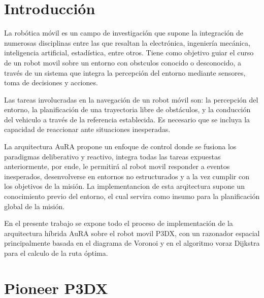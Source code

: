 \documentclass[11pt,twoside,A5]{article}
\begin{document}
%
%
%

\section*{Introducción}

La robótica móvil es un campo de investigación que supone la integración de numerosas disciplinas
entre las que resaltan la electrónica, ingeniería mecánica,
inteligencia artificial, estadística, entre otros. Tiene como objetivo 
guiar el curso de un robot movil sobre un entorno con obstculos conocido o desconocido,
a través de un sistema que integra la percepción del entorno mediante
sensores, toma de decisiones y acciones.

Las tareas involucradas en la navegación de un robot móvil son: la percepción del
entorno, la planificación de una trayectoria libre de obstáculos, y la conducción del vehiculo a través de la referencia establecida.
Es necesario que se incluya la capacidad de reaccionar ante situaciones inesperadas.

La arquitectura AuRA propone un enfoque de control donde se fusiona los paradigmas deliberativo y reactivo,
integra todas las tareas expuestas anteriormente, por ende, le permitirá al robot movil responder a eventos inesperados, desenvolverse en 
entornos no estructurados y a la vez cumplir con los objetivos de la misión. La implementancion de esta arqitectura supone un conocimiento previo
del entorno, el cual servira como insumo para la planificación global de la misión.

En el presente trabajo se expone todo el proceso de implementación de la arquitectura híbrida AuRA sobre el robot movil P3DX,
con un razonador espacial principalmente basada en el diagrama de Voronoi y en el algoritmo voraz Dijkstra para el calculo de 
la ruta óptima.

\section*{Pioneer P3DX}
\end{document}
